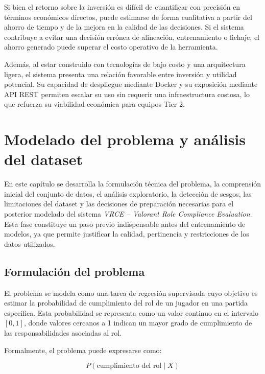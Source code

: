 \documentclass{ULBreport} %
\begin{document}
Si bien el retorno sobre la inversión es difícil de cuantificar con precisión en términos económicos directos, puede estimarse de forma cualitativa a partir del ahorro de tiempo y de la mejora en la calidad de las decisiones. Si el sistema contribuye a evitar una decisión errónea de alineación, entrenamiento o fichaje, el ahorro generado puede superar el costo operativo de la herramienta.

Además, al estar construido con tecnologías de bajo costo y una arquitectura ligera, el sistema presenta una relación favorable entre inversión y utilidad potencial. Su capacidad de despliegue mediante Docker y su exposición mediante API REST permiten escalar su uso sin requerir una infraestructura costosa, lo que refuerza su viabilidad económica para equipos Tier 2.

\chapter{Modelado del problema y análisis del dataset}

En este capítulo se desarrolla la formulación técnica del problema, la comprensión inicial del conjunto de datos, el análisis exploratorio, la detección de sesgos, las limitaciones del dataset y las decisiones de preparación necesarias para el posterior modelado del sistema \textit{VRCE -- Valorant Role Compliance Evaluation}. Esta fase constituye un paso previo indispensable antes del entrenamiento de modelos, ya que permite justificar la calidad, pertinencia y restricciones de los datos utilizados.

\section{Formulación del problema}

El problema se modela como una tarea de regresión supervisada cuyo objetivo es estimar la probabilidad de cumplimiento del rol de un jugador en una partida específica. Esta probabilidad se representa como un valor continuo en el intervalo $[0,1]$, donde valores cercanos a 1 indican un mayor grado de cumplimiento de las responsabilidades asociadas al rol.

Formalmente, el problema puede expresarse como:

\[
P(\text{cumplimiento del rol} \mid X)
\]
\end{document}
